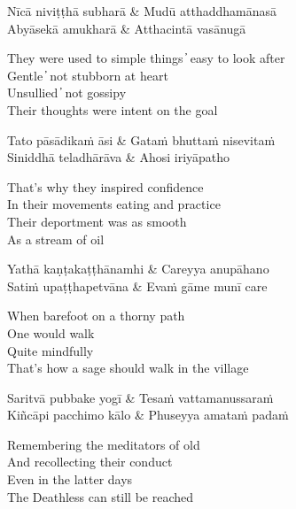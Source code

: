 \begin{twochants}
  Nīcā niviṭṭhā subharā & Mudū atthaddhamānasā\\
  Abyāsekā amukharā & Atthacintā vasānugā\\
\end{twochants}

\begin{english}
  They were used to simple things  ̓  easy to look after\\
  Gentle  ̓  not stubborn at heart\\
  Unsullied  ̓  not gossipy\\
  Their thoughts were intent on the goal
\end{english}

\begin{twochants}
  Tato pāsādikaṁ āsi & Gataṁ bhuttaṁ nisevitaṁ\\
  Siniddhā teladhārāva & Ahosi iriyāpatho\\
\end{twochants}

\begin{english}
  That’s why they inspired confidence\\
  In their movements eating and practice\\
  Their deportment was as smooth\\
  As a stream of oil
\end{english}

\begin{twochants}
  Yathā kaṇṭakaṭṭhānamhi & Careyya anupāhano\\
  Satiṁ upaṭṭhapetvāna & Evaṁ gāme munī care\\
\end{twochants}

\begin{english}
  When barefoot on a thorny path\\
  One would walk\\
  Quite mindfully\\
  That’s how a sage should walk in the village
\end{english}

\begin{twochants}
  Saritvā pubbake yogī & Tesaṁ vattamanussaraṁ\\
  Kiñcāpi pacchimo kālo & Phuseyya amataṁ padaṁ\\
\end{twochants}

\begin{english}
  Remembering the meditators of old\\
  And recollecting their conduct\\
  Even in the latter days\\
  The Deathless can still be reached
\end{english}

